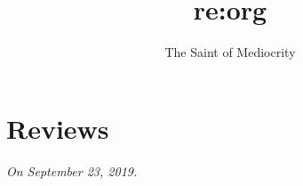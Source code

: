 \documentclass[openany]{tufte-book}
\title{re:org}
\author{The Saint of Mediocrity}
\begin{document}
\frontmatter
\maketitle
\tableofcontents
\mainmatter

\chapter{Reviews}
\textit{On September 23, 2019.}

\backmatter


\end{document}
